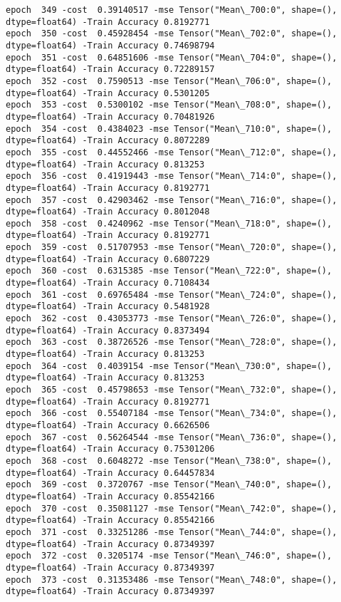 \documentclass[11pt]{article}
\begin{document}
\begin{Verbatim}[commandchars=\\\{\}]
epoch  349 -cost  0.39140517 -mse Tensor("Mean\_700:0", shape=(), dtype=float64) -Train Accuracy 0.8192771
epoch  350 -cost  0.45928454 -mse Tensor("Mean\_702:0", shape=(), dtype=float64) -Train Accuracy 0.74698794
epoch  351 -cost  0.64851606 -mse Tensor("Mean\_704:0", shape=(), dtype=float64) -Train Accuracy 0.72289157
epoch  352 -cost  0.7590513 -mse Tensor("Mean\_706:0", shape=(), dtype=float64) -Train Accuracy 0.5301205
epoch  353 -cost  0.5300102 -mse Tensor("Mean\_708:0", shape=(), dtype=float64) -Train Accuracy 0.70481926
epoch  354 -cost  0.4384023 -mse Tensor("Mean\_710:0", shape=(), dtype=float64) -Train Accuracy 0.8072289
epoch  355 -cost  0.44552466 -mse Tensor("Mean\_712:0", shape=(), dtype=float64) -Train Accuracy 0.813253
epoch  356 -cost  0.41919443 -mse Tensor("Mean\_714:0", shape=(), dtype=float64) -Train Accuracy 0.8192771
epoch  357 -cost  0.42903462 -mse Tensor("Mean\_716:0", shape=(), dtype=float64) -Train Accuracy 0.8012048
epoch  358 -cost  0.4240962 -mse Tensor("Mean\_718:0", shape=(), dtype=float64) -Train Accuracy 0.8192771
epoch  359 -cost  0.51707953 -mse Tensor("Mean\_720:0", shape=(), dtype=float64) -Train Accuracy 0.6807229
epoch  360 -cost  0.6315385 -mse Tensor("Mean\_722:0", shape=(), dtype=float64) -Train Accuracy 0.7108434
epoch  361 -cost  0.69765484 -mse Tensor("Mean\_724:0", shape=(), dtype=float64) -Train Accuracy 0.5481928
epoch  362 -cost  0.43053773 -mse Tensor("Mean\_726:0", shape=(), dtype=float64) -Train Accuracy 0.8373494
epoch  363 -cost  0.38726526 -mse Tensor("Mean\_728:0", shape=(), dtype=float64) -Train Accuracy 0.813253
epoch  364 -cost  0.4039154 -mse Tensor("Mean\_730:0", shape=(), dtype=float64) -Train Accuracy 0.813253
epoch  365 -cost  0.45798653 -mse Tensor("Mean\_732:0", shape=(), dtype=float64) -Train Accuracy 0.8192771
epoch  366 -cost  0.55407184 -mse Tensor("Mean\_734:0", shape=(), dtype=float64) -Train Accuracy 0.6626506
epoch  367 -cost  0.56264544 -mse Tensor("Mean\_736:0", shape=(), dtype=float64) -Train Accuracy 0.75301206
epoch  368 -cost  0.6048272 -mse Tensor("Mean\_738:0", shape=(), dtype=float64) -Train Accuracy 0.64457834
epoch  369 -cost  0.3720767 -mse Tensor("Mean\_740:0", shape=(), dtype=float64) -Train Accuracy 0.85542166
epoch  370 -cost  0.35081127 -mse Tensor("Mean\_742:0", shape=(), dtype=float64) -Train Accuracy 0.85542166
epoch  371 -cost  0.33251286 -mse Tensor("Mean\_744:0", shape=(), dtype=float64) -Train Accuracy 0.87349397
epoch  372 -cost  0.3205174 -mse Tensor("Mean\_746:0", shape=(), dtype=float64) -Train Accuracy 0.87349397
epoch  373 -cost  0.31353486 -mse Tensor("Mean\_748:0", shape=(), dtype=float64) -Train Accuracy 0.87349397

\end{Verbatim}
\end{document}
